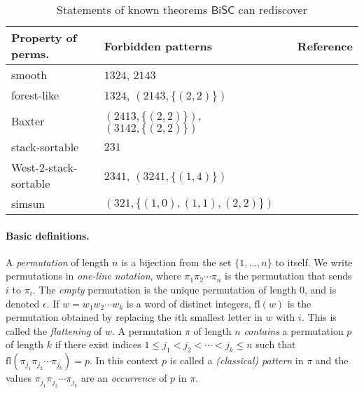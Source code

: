 \documentclass[a4paper]{article}
\newcommand{\bisc}{\mathsf{BiSC}}
\newcommand{\fl}{\mathrm{fl}}
\begin{document}
\begin{table}[htp]
  \begin{center}
    \begin{tabular}{lll}
      \toprule
      Property of perms.\         & Forbidden patterns                     & Reference               \\
      \midrule
      smooth                      & $1324$, $2143$                         & \cite[Thm.~1]{LS}       \\
      forest-like                 & $1324$, $(2143,\{(2,2)\})$             & \cite[Thm.~1]{BMB}      \\
      Baxter                      & $(2413,\{(2,2)\})$, $(3142,\{(2,2)\})$ & \cite[p.~383]{Baxter}   \\
      stack-sortable              & $231$                                  & \cite[Section 2.2.1]{K} \\
      West-$2$-stack-sortable     & $2341$, $(3241,\{(1,4)\})$             & \cite[Thm.~4.2.18]{W90} \\
      simsun                      & $(321,\{(1,0),(1,1),(2,2)\})$          & \cite[p.~7]{BC}         \\
      \bottomrule
    \end{tabular}
  \end{center}
  \caption{Statements of known theorems $\bisc$ can rediscover}
  \label{tab:props}
\end{table}%

\paragraph{Basic definitions.}
A \emph{permutation} of length $n$ is a bijection from the set $\{1, \dotsc, n\}$ to
itself. We write permutations in \emph{one-line notation}, where $\pi_1
  \pi_2 \dotsm \pi_n$ is the permutation that sends $i$ to $\pi_i$. The \emph{empty}
permutation is the unique permutation of length $0$, and is denoted $\epsilon$.
If $w = w_1 w_2 \dotsm w_k$ is a word of distinct integers, $\fl(w)$ is the
permutation obtained by replacing the $i$th smallest letter in $w$ with $i$.
This is called the \emph{flattening} of $w$. A permutation $\pi$ of length $n$
\emph{contains} a permutation $p$ of length $k$ if there exist indices $1 \leq
  j_1 < j_2 < \dotsm < j_k \leq n$ such that $\fl(\pi_{j_1} \pi_{j_2} \dotsm
  \pi_{j_k}) = p$. In this context $p$ is called a \emph{(classical) pattern} in
$\pi$ and the values $\pi_{j_1} \pi_{j_2} \dotsm \pi_{j_k}$ are an
\emph{occurrence} of $p$ in $\pi$.
\end{document}
